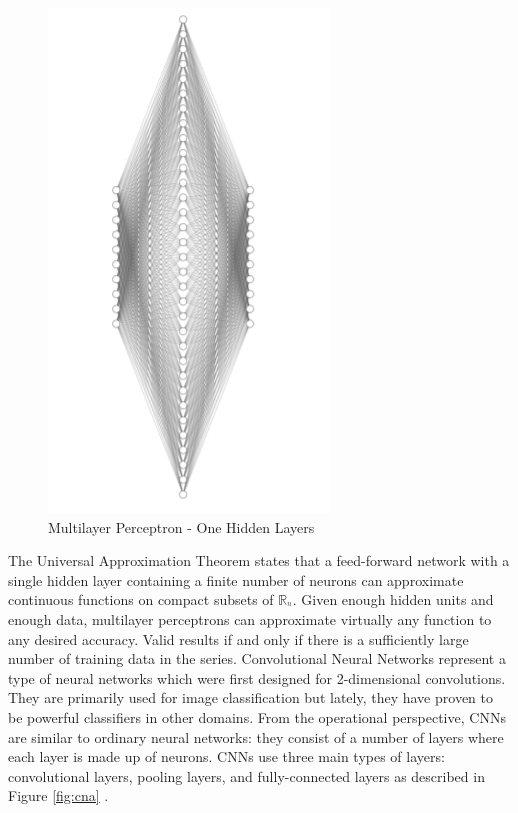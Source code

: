 \begin{figure}
    \centering
    \includegraphics[scale=0.5]{images/chapter8/one_layer.PNG}
    \caption{Multilayer Perceptron - One Hidden Layers}
\end{figure}

The Universal Approximation Theorem states that a feed-forward network with a single hidden layer containing a
finite number of neurons can approximate continuous
functions on compact subsets of $\mathbb{R}_{^n}$. Given enough hidden units and enough data, multilayer perceptrons can approximate virtually any function to any desired accuracy. Valid results if and only if there is a sufficiently large number of training data in the series.
\newline
Convolutional Neural Networks represent a type of neural networks which were first designed for 2-dimensional convolutions. They are primarily used for image classification but lately, they have proven to be powerful classifiers in other domains. From the operational perspective, CNNs are similar to ordinary neural networks: they consist of a number of layers where each layer is made up of neurons. CNNs use three main types of layers: convolutional layers, pooling layers, and fully-connected layers as described in Figure \ref{fig:cna} .


